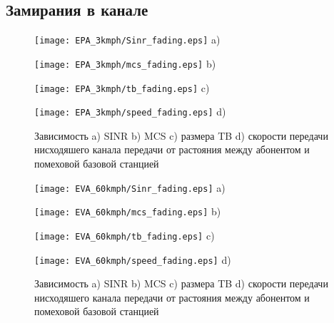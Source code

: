 \subsection{Замирания в канале}  \label{sect2_2_4}






\begin{figure} [H]
\begin{minipage}[h]{0.47\linewidth}
\center
\texttt{[image: EPA\_3kmph/Sinr\_fading.eps]} a) \\
\end{minipage}
\hfill
\begin{minipage}[h]{0.47\linewidth}
\center
\texttt{[image: EPA\_3kmph/mcs\_fading.eps]} b) \\
\end{minipage}
\vfill
\begin{minipage}[h]{0.47\linewidth}
\center
\texttt{[image: EPA\_3kmph/tb\_fading.eps]} c) \\
\end{minipage}
\hfill
\begin{minipage}[h]{0.47\linewidth}
\center
\texttt{[image: EPA\_3kmph/speed\_fading.eps]} d) \\
\end{minipage}
\caption{Зависимость a) SINR b) MCS c) размера TB d) скорости передачи нисходяшего канала передачи от растояния между абонентом и помеховой базовой станцией}
\label{img:inter}
\end{figure}

\begin{figure} [H]
\begin{minipage}[h]{0.47\linewidth}
\center
\texttt{[image: EVA\_60kmph/Sinr\_fading.eps]} a) \\
\end{minipage}
\hfill
\begin{minipage}[h]{0.47\linewidth}
\center
\texttt{[image: EVA\_60kmph/mcs\_fading.eps]} b) \\
\end{minipage}
\vfill
\begin{minipage}[h]{0.47\linewidth}
\center
\texttt{[image: EVA\_60kmph/tb\_fading.eps]} c) \\
\end{minipage}
\hfill
\begin{minipage}[h]{0.47\linewidth}
\center
\texttt{[image: EVA\_60kmph/speed\_fading.eps]} d) \\
\end{minipage}
\caption{Зависимость a) SINR b) MCS c) размера TB d) скорости передачи нисходяшего канала передачи от растояния между абонентом и помеховой базовой станцией}
\label{img:inter}
\end{figure}




\clearpage




